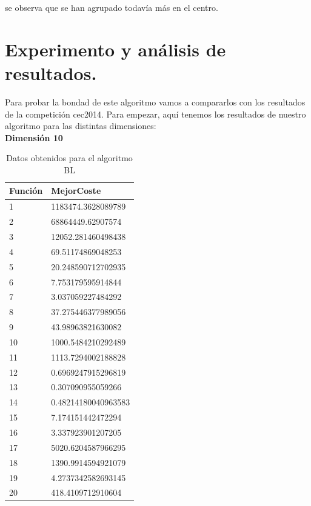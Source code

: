 se observa que se han agrupado todavía más en el centro. 


\section{Experimento y análisis de resultados.}

Para probar la bondad de este algoritmo vamos a compararlos con los resultados de la competición cec2014. Para empezar, aquí tenemos los resultados de nuestro algoritmo para las distintas dimensiones:\\

\textbf{Dimensión 10}

\begin{table}[htbp]
	\begin{center}
		\begin{tabular}{|l|l|}
			\hline
			Función & MejorCoste \\
			\hline \hline
			1 & 1183474.3628089789\\ \hline
			2 & 68864449.62907574 \\ \hline
			3 & 12052.281460498438 \\ \hline
			4 & 69.51174869048253 \\ \hline
			5 & 20.248590712702935 \\ \hline
			6 & 7.753179595914844 \\ \hline
			7 & 3.037059227484292 \\ \hline
			8 & 37.275446377989056 \\ \hline
			9 & 43.98963821630082 \\ \hline
			10 & 1000.5484210292489 \\ \hline
			11 & 1113.7294002188828 \\ \hline
			12 & 0.6969247915296819 \\ \hline
			13 & 0.307090955059266 \\ \hline
			14 & 0.48214180040963583 \\ \hline
			15 & 7.174151442472294 \\ \hline
			16 & 3.337923901207205 \\ \hline
			17 & 5020.6204587966295 \\ \hline
			18 & 1390.9914594921079 \\ \hline
			19 & 4.2737342582693145 \\ \hline
			20 & 418.4109712910604 \\ \hline
			
		\end{tabular}
		\caption{Datos obtenidos para el algoritmo BL}
		\label{tabla:Dimension10}
	\end{center}
\end{table}








